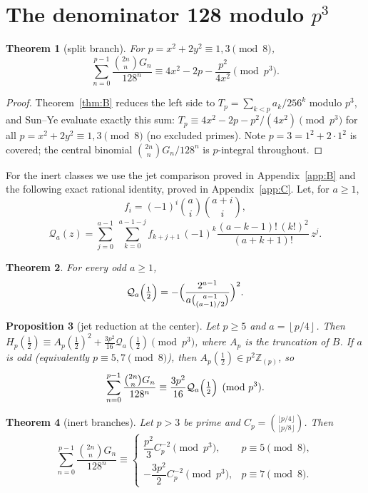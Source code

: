 \documentclass[11pt]{amsart}
\newtheorem{theorem}{Theorem}[section]
\newtheorem{proposition}[theorem]{Proposition}
\theoremstyle{definition}
\theoremstyle{remark}
\newcommand{\Zp}{\mathbb{Z}_{(p)}}
\newcommand{\fl}[1]{\left\lfloor #1 \right\rfloor}
\begin{document}
\section{The denominator 128 modulo \texorpdfstring{$p^3$}{p-cubed}}\label{sec:7}

\begin{theorem}[split branch]\label{thm:128split}
For $p=x^2+2y^2\equiv1,3\pmod8$,
\[
\sum_{n=0}^{p-1}\frac{\binom{2n}{n}G_n}{128^n}
\equiv4x^2-2p-\frac{p^2}{4x^2}\pmod{p^3}.
\]
\end{theorem}

\begin{proof}
Theorem~\ref{thm:B} reduces the left side to
$T_p=\sum_{k<p}a_k/256^k$ modulo $p^3$, and Sun--Ye
\cite[Theorem~1.5]{SunYe} evaluate exactly this sum:
$T_p\equiv4x^2-2p-p^2/(4x^2)\pmod{p^3}$ for all
$p=x^2+2y^2\equiv1,3\pmod8$ (no excluded primes). Note $p=3=1^2+2\cdot1^2$
is covered; the central binomial $\binom{2n}{n}G_n/128^n$ is
$p$-integral throughout.
\end{proof}

For the inert classes we use the jet comparison proved in
Appendix~\ref{app:B} and the following exact rational identity, proved
in Appendix~\ref{app:C}. Let, for $a\ge1$,
\[
f_i=(-1)^i\binom ai\binom{a+i}{i},
\]
\[
\mathcal Q_a(z)=\sum_{j=0}^{a-1}\ \sum_{k=0}^{a-1-j}
f_{k+j+1}\,(-1)^k\frac{(a-k-1)!\,(k!)^2}{(a+k+1)!}\,z^j .
\]

\begin{theorem}\label{thm:E}
For every odd $a\ge1$,
\[
\mathcal Q_a\Bigl(\tfrac12\Bigr)
=-\Bigl(\frac{2^{a-1}}{a\binom{a-1}{(a-1)/2}}\Bigr)^2 .
\]
\end{theorem}

\begin{proposition}[jet reduction at the center]\label{prop:jet}
Let $p\ge5$ and $a=\fl{p/4}$. Then
$H_p(\tfrac12)\equiv A_p(\tfrac12)^2+\frac{3p^2}{16}\mathcal
Q_a(\tfrac12)\pmod{p^3}$,
where $A_p$ is the truncation of $B$. If $a$ is odd
(equivalently $p\equiv5,7\pmod8$), then $A_p(\tfrac12)\in p^2\Zp$, so
\[
\sum_{n=0}^{p-1}\frac{\binom{2n}{n}G_n}{128^n}
\equiv\frac{3p^2}{16}\mathcal Q_a\Bigl(\tfrac12\Bigr)\pmod{p^3}.
\]
\end{proposition}

\begin{theorem}[inert branches]\label{thm:128inert}
Let $p>3$ be prime and $C_p=\binom{\lfloor p/4\rfloor}{\lfloor p/8\rfloor}$.
Then
\[
\sum_{n=0}^{p-1}\frac{\binom{2n}{n}G_n}{128^n}
\equiv
\begin{cases}
\dfrac{p^2}{3}C_p^{-2}\pmod{p^3},&p\equiv5\pmod8,\\[2mm]
-\dfrac{3p^2}{2}C_p^{-2}\pmod{p^3},&p\equiv7\pmod8.
\end{cases}
\]
\end{theorem}
\end{document}
